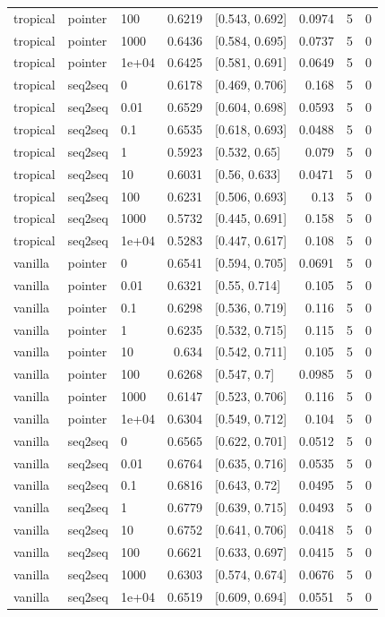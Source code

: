 \documentclass[10pt]{article}
\begin{document}
{\begin{longtable}{lllrlrrr}
tropical & pointer & 100 & 0.6219 & [0.543, 0.692] & 0.0974 & 5 & 0\\
tropical & pointer & 1000 & 0.6436 & [0.584, 0.695] & 0.0737 & 5 & 0\\
tropical & pointer & 1e+04 & 0.6425 & [0.581, 0.691] & 0.0649 & 5 & 0\\
tropical & seq2seq & 0 & 0.6178 & [0.469, 0.706] & 0.168 & 5 & 0\\
tropical & seq2seq & 0.01 & 0.6529 & [0.604, 0.698] & 0.0593 & 5 & 0\\
tropical & seq2seq & 0.1 & 0.6535 & [0.618, 0.693] & 0.0488 & 5 & 0\\
tropical & seq2seq & 1 & 0.5923 & [0.532, 0.65] & 0.079 & 5 & 0\\
tropical & seq2seq & 10 & 0.6031 & [0.56, 0.633] & 0.0471 & 5 & 0\\
tropical & seq2seq & 100 & 0.6231 & [0.506, 0.693] & 0.13 & 5 & 0\\
tropical & seq2seq & 1000 & 0.5732 & [0.445, 0.691] & 0.158 & 5 & 0\\
tropical & seq2seq & 1e+04 & 0.5283 & [0.447, 0.617] & 0.108 & 5 & 0\\
vanilla & pointer & 0 & 0.6541 & [0.594, 0.705] & 0.0691 & 5 & 0\\
vanilla & pointer & 0.01 & 0.6321 & [0.55, 0.714] & 0.105 & 5 & 0\\
vanilla & pointer & 0.1 & 0.6298 & [0.536, 0.719] & 0.116 & 5 & 0\\
vanilla & pointer & 1 & 0.6235 & [0.532, 0.715] & 0.115 & 5 & 0\\
vanilla & pointer & 10 & 0.634 & [0.542, 0.711] & 0.105 & 5 & 0\\
vanilla & pointer & 100 & 0.6268 & [0.547, 0.7] & 0.0985 & 5 & 0\\
vanilla & pointer & 1000 & 0.6147 & [0.523, 0.706] & 0.116 & 5 & 0\\
vanilla & pointer & 1e+04 & 0.6304 & [0.549, 0.712] & 0.104 & 5 & 0\\
vanilla & seq2seq & 0 & 0.6565 & [0.622, 0.701] & 0.0512 & 5 & 0\\
vanilla & seq2seq & 0.01 & 0.6764 & [0.635, 0.716] & 0.0535 & 5 & 0\\
vanilla & seq2seq & 0.1 & 0.6816 & [0.643, 0.72] & 0.0495 & 5 & 0\\
vanilla & seq2seq & 1 & 0.6779 & [0.639, 0.715] & 0.0493 & 5 & 0\\
vanilla & seq2seq & 10 & 0.6752 & [0.641, 0.706] & 0.0418 & 5 & 0\\
vanilla & seq2seq & 100 & 0.6621 & [0.633, 0.697] & 0.0415 & 5 & 0\\
vanilla & seq2seq & 1000 & 0.6303 & [0.574, 0.674] & 0.0676 & 5 & 0\\
vanilla & seq2seq & 1e+04 & 0.6519 & [0.609, 0.694] & 0.0551 & 5 & 0\\
\bottomrule
\end{longtable}
}
\end{document}
